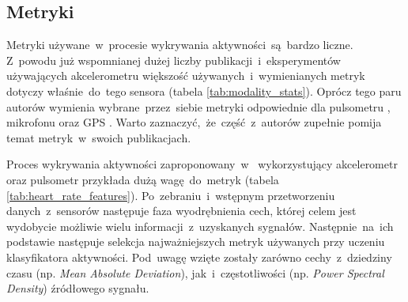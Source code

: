 \subsection{Metryki}
Metryki używane~w~procesie wykrywania aktywności~są~bardzo liczne. Z~powodu już wspomnianej dużej liczby publikacji~i~eksperymentów używających akcelerometru większość używanych~i~wymienianych metryk dotyczy właśnie~do~tego sensora (tabela \ref{tab:modality_stats}). Oprócz tego paru autorów wymienia wybrane~przez~siebie metryki odpowiednie dla pulsometru \cite{S04}, mikrofonu \cite{S22, S46} oraz GPS \cite{S26}. Warto zaznaczyć,~że~część~z~autorów zupełnie pomija temat metryk~w~swoich publikacjach.


Proces wykrywania aktywności zaproponowany~w~\cite{S04} wykorzystujący akcelerometr oraz pulsometr przykłada dużą wagę~do~metryk (tabela \ref{tab:heart_rate_features}). Po~zebraniu~i~wstępnym przetworzeniu danych~z~sensorów następuje faza wyodrębnienia cech, której celem jest wydobycie możliwie wielu informacji~z~uzyskanych sygnałów. Następnie~na~ich podstawie następuje selekcja najważniejszych metryk używanych przy uczeniu klasyfikatora aktywności. Pod~uwagę wzięte zostały zarówno cechy~z~dziedziny czasu (np. {\it Mean Absolute Deviation}), jak~i~częstotliwości (np. {\it Power Spectral Density}) źródłowego sygnału.


